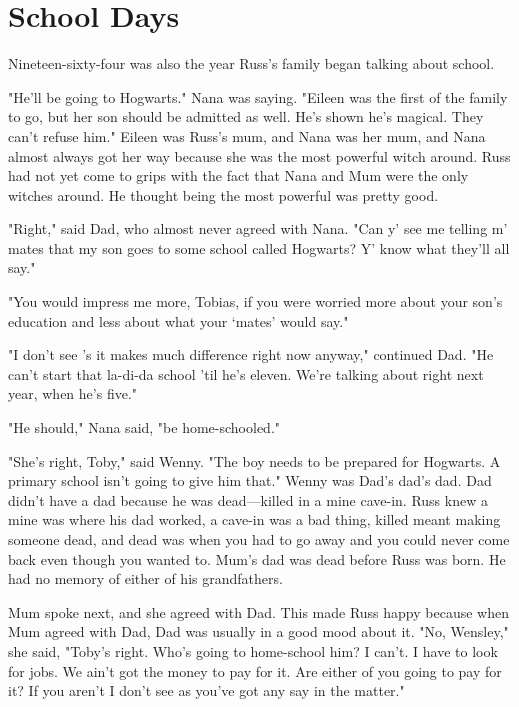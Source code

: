 
\chapter{School Days}

Nineteen-sixty-four was also the year Russ's family began talking about school.

"He'll be going to Hogwarts." Nana was saying. "Eileen was the first of the family to go, but her son should be admitted as well. He's shown he's magical. They can't refuse him." Eileen was Russ's mum, and Nana was her mum, and Nana almost always got her way because she was the most powerful witch around. Russ had not yet come to grips with the fact that Nana and Mum were the only witches around. He thought being the most powerful was pretty good.

"Right," said Dad, who almost never agreed with Nana. "Can y' see me telling m' mates that my son goes to some school called Hogwarts? Y' know what they'll all say."

"You would impress me more, Tobias, if you were worried more about your son's education and less about what your `mates' would say."

"I don't see 's it makes much difference right now anyway," continued Dad. "He can't start that la-di-da school 'til he's eleven. We're talking about right next year, when he's five."

"He should," Nana said, "be home-schooled."

"She's right, Toby," said Wenny. "The boy needs to be prepared for Hogwarts. A primary school isn't going to give him that." Wenny was Dad's dad's dad. Dad didn't have a dad because he was dead—killed in a mine cave-in. Russ knew a mine was where his dad worked, a cave-in was a bad thing, killed meant making someone dead, and dead was when you had to go away and you could never come back even though you wanted to. Mum's dad was dead before Russ was born. He had no memory of either of his grandfathers.

Mum spoke next, and she agreed with Dad. This made Russ happy because when Mum agreed with Dad, Dad was usually in a good mood about it. "No, Wensley," she said, "Toby's right. Who's going to home-school him? I can't. I have to look for jobs. We ain't got the money to pay for it. Are either of you going to pay for it? If you aren't I don't see as you've got any say in the matter."

